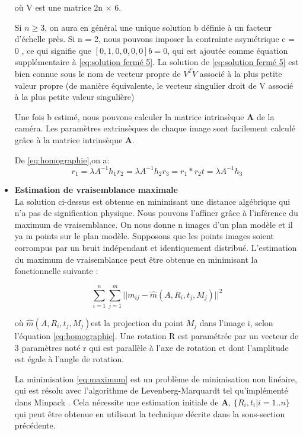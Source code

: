 \begin{itemize}[label={\Huge$\star$}]
 où V est une matrice 2n × 6. 
 
Si $n \geq 3$, on aura en général une unique solution b définie à un facteur d'échelle près.
Si n = 2, nous pouvons imposer la contrainte asymétrique c = 0 , ce qui signifie que $[0, 1, 0, 0, 0, 0]b = 0$, qui est ajoutée comme équation supplémentaire à \ref{eq:solution fermé 5}. La solution de \ref{eq:solution fermé 5} est bien connue sous le nom de vecteur propre de $V^{T}V$ associé à la plus petite valeur propre (de manière équivalente, le vecteur singulier droit de V associé à la plus petite valeur singulière)
 
 Une fois b estimé, nous pouvons calculer la matrice intrinsèque \textbf{A} de la caméra.  
 Les paramètres extrinsèques de chaque image sont facilement calculé grâce à la matrice  intrinsèque \textbf{A}.
 
 De \ref{eq:homographie},on a: 
 \[
 r_{1}=\lambda A^{-1}h_{1}
 r_{2}=\lambda A^{-1}h_{2}
 r_{3}=r_{1}*r_{2}
 t=\lambda A^{-1}h_{3}
 \]
 
 
\item \textbf{Estimation de vraisemblance maximale} 
 \\
 
 La solution ci-dessus est obtenue en minimisant une distance 
 algébrique qui n'a pas de signification physique. Nous pouvons l’affiner 
 grâce à l’inférence du maximum de vraisemblance.
 On nous donne n images d’un plan modèle et il ya m points sur le 
 plan modèle. Supposons que les points images soient corrompus par un 
 bruit indépendant et identiquement distribué.
 L'estimation du maximum de vraisemblance peut être obtenue en minimisant la fonctionnelle suivante :
 
 \begin{equation}
 \sum_{i=1}^{n} \sum_{j=1}^{m} 
 ||m_{ij}-\hat{m}(A,R_{i},t_{j},M_{j})||^{2}
 \label{eq:maximum}
\end{equation}
 
 où $\hat{m}(A,R_{i},t_{j},M_{j})$est la projection du point $M_{j}$  dans l'image i, selon l'équation \ref{eq:homographie}. Une rotation R est paramétrée par un vecteur de 3 paramètres noté r qui est parallèle à l'axe de rotation et dont l'amplitude est égale à l'angle de rotation.  
 
 La minimisation  \ref{eq:maximum} est un problème de minimisation non 
 linéaire, qui est résolu avec l'algorithme de Levenberg-Marquardt tel 
 qu'implémenté dans Minpack \cite{watson_levenberg-marquardt_1978}. Cela nécessite une estimation initiale 
 de \textbf{A}, $\{R_i, t_i|i = 1..n\}$ qui peut être obtenue en utilisant la technique 
 décrite dans la sous-section précédente.\\
 

\end{itemize}

